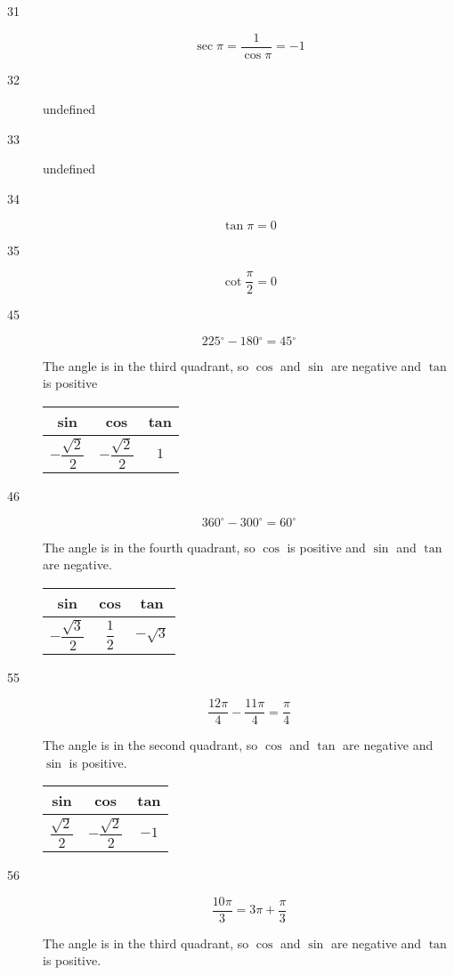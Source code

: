 \documentclass[fleqn,addpoints]{exam}
\newcommand{\degree}{\ensuremath{^\circ}}
\begin{document}
\begin{description}
\item[31]
\[
  \sec \pi = \frac{1}{\cos \pi} = -1
\]

\item[32]
undefined

\item[33]
undefined

\item[34]
\[
  \tan \pi = 0
\]

\item[35]
\[
  \cot \frac{\pi}{2} = 0
\]


\item[45]
\[
  225 \degree - 180 \degree = 45 \degree
\]

The angle is in the third quadrant, so $\cos$ and $\sin$ are negative and $\tan$ is positive

\begin{tabular}{ccc}
\toprule
sin & cos & tan \\
\midrule
  $-\dfrac{\sqrt{2}}{2}$ & $-\dfrac{\sqrt{2}}{2}$ & $1$ \\
\bottomrule
\end{tabular}

\item[46]
\[
  360 \degree - 300 \degree = 60 \degree
\]

The angle is in the fourth quadrant, so $\cos$ is positive and $\sin$ and $\tan$ are negative.

\begin{tabular}{ccc}
\toprule
sin & cos & tan \\
\midrule
  $-\dfrac{\sqrt{3}}{2}$ & $\dfrac{1}{2}$ & $-\sqrt{3}$ \\
\bottomrule
\end{tabular}

\item[55]
\[
  \frac{12 \pi}{4} - \frac{11 \pi}{4} = \frac{\pi}{4}
\]

The angle is in the second quadrant, so $\cos$ and $\tan$ are negative and $\sin$ is positive.

\begin{tabular}{ccc}
\toprule
sin & cos & tan \\
\midrule
  $\dfrac{\sqrt{2}}{2}$ & $-\dfrac{\sqrt{2}}{2}$ & $-1$ \\
\bottomrule
\end{tabular}

\item[56]
\[
  \frac{10 \pi}{3} = 3 \pi + \frac{\pi}{3}
\]

The angle is in the third quadrant, so $\cos$ and $\sin$ are negative and $\tan$ is positive.


\end{description}
\end{document}
